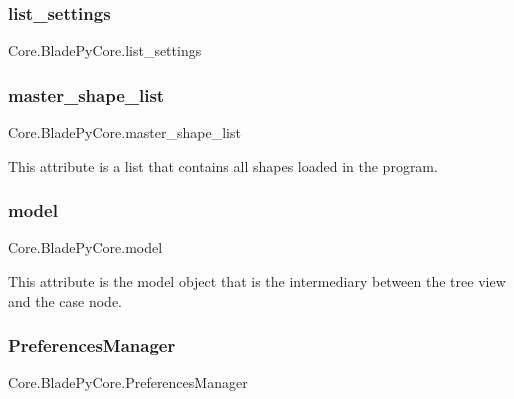 \hypertarget{a00078_a96038d8a4727208ba2e9cd359bcd4781}{}\label{a00078_a96038d8a4727208ba2e9cd359bcd4781} 
\subsubsection{\texorpdfstring{list\+\_\+settings}{list\_settings}}
{\footnotesize\ttfamily Core.\+Blade\+Py\+Core.\+list\+\_\+settings}

\hypertarget{a00078_a819ef9e1cd2f233d92a5379532060bd0}{}\label{a00078_a819ef9e1cd2f233d92a5379532060bd0} 
\subsubsection{\texorpdfstring{master\+\_\+shape\+\_\+list}{master\_shape\_list}}
{\footnotesize\ttfamily Core.\+Blade\+Py\+Core.\+master\+\_\+shape\+\_\+list}



This attribute is a list that contains all shapes loaded in the program. 

\hypertarget{a00078_ac74bebda7bd9e99df8e5d26c0b61e0bb}{}\label{a00078_ac74bebda7bd9e99df8e5d26c0b61e0bb} 
\subsubsection{\texorpdfstring{model}{model}}
{\footnotesize\ttfamily Core.\+Blade\+Py\+Core.\+model}



This attribute is the model object that is the intermediary between the tree view and the case node. 

\hypertarget{a00078_abfb58254f95f980e2821bac01114cd40}{}\label{a00078_abfb58254f95f980e2821bac01114cd40} 
\subsubsection{\texorpdfstring{Preferences\+Manager}{PreferencesManager}}
{\footnotesize\ttfamily Core.\+Blade\+Py\+Core.\+Preferences\+Manager}

